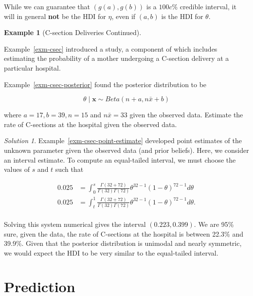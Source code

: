 \documentclass[
  letterpaper,
  DIV=11,
  numbers=noendperiod]{scrreprt}
\theoremstyle{definition}
\theoremstyle{plain}
\theoremstyle{definition}
\newtheorem{example}{Example}[chapter]
\theoremstyle{remark}
\newtheorem*{solution}{Solution}
\begin{document}
While we can guarantee that \(\left(g(a), g(b)\right)\) is a \(100c\)\%
credible interval, it will in general \textbf{not} be the HDI for
\(\eta\), even if \((a, b)\) is the HDI for \(\theta\).

\begin{example}[C-section Deliveries
Continued]\protect\hypertarget{exm-csec-interval-estimate}{}\label{exm-csec-interval-estimate}

Example~\ref{exm-csec} introduced a study, a component of which includes
estimating the probability of a mother undergoing a C-section delivery
at a particular hospital.

Example~\ref{exm-csec-posterior} found the posterior distribution to be

\[\theta \mid \mathbf{x} \sim Beta\left(n + a, n\bar{x} + b\right)\]

where \(a = 17, b = 39, n = 15\) and \(n\bar{x} = 33\) given the
observed data. Estimate the rate of C-sections at the hospital given the
observed data.

\end{example}

\begin{solution}

Example~\ref{exm-csec-point-estimate} developed point estimates of the
unknown parameter given the observed data (and prior beliefs). Here, we
consider an interval estimate. To compute an equal-tailed interval, we
must choose the values of \(s\) and \(t\) such that

\[
\begin{aligned}
  0.025 &= \int_{0}^{s} \frac{\Gamma(32 + 72)}{\Gamma(32) \Gamma(72)} \theta^{32 - 1} (1 - \theta)^{72 - 1} d\theta \\
  0.025 &= \int_{t}^{1} \frac{\Gamma(32 + 72)}{\Gamma(32) \Gamma(72)} \theta^{32 - 1} (1 - \theta)^{72 - 1} d\theta. \\
\end{aligned}
\]

Solving this system numerical gives the interval \((0.223, 0.399)\). We
are 95\% sure, given the data, the rate of C-sections at the hospital is
between 22.3\% and 39.9\%. Given that the posterior distribution is
unimodal and nearly symmetric, we would expect the HDI to be very
similar to the equal-tailed interval.

\end{solution}

\hypertarget{sec-prediction}{%
\chapter{Prediction}\label{sec-prediction}}
\end{document}
